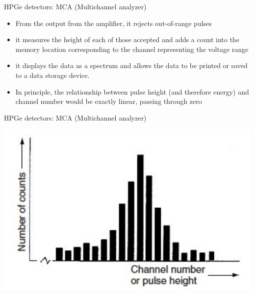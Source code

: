 \begin{frame}{HPGe detectors: MCA (Multichannel analyzer)}

\begin{exampleblock}{}
{\small 
\begin{itemize}
\item From the output from the amplifier, it rejects out-of-range pulses
\item it measures the height of each of those accepted and adds a count into the memory location corresponding to the channel representing the voltage range
\item it displays the data as a spectrum and allows the data to be printed or saved to a data storage device.
\item In principle, the relationship between pulse height (and therefore energy) and channel number would be exactly linear, passing through zero
\end{itemize}
}
\end{exampleblock}


\end{frame}

\begin{frame}{HPGe detectors: MCA (Multichannel analyzer)}

\centering
\includegraphics[scale=0.5]{figures/mca.png}

\end{frame}

